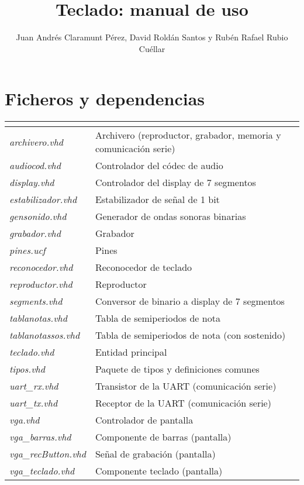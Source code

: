 \documentclass{article}
\title{Teclado: manual de uso}
\author{Juan Andrés Claramunt Pérez, David Roldán Santos y Rubén Rafael Rubio Cuéllar}
\begin{document}
\maketitle

\section{Ficheros y dependencias}

\let\sep\hline


\begin{tabu}{| >{\itshape}X[2, l] | X[7, l] |}
	 \\ \sep
	archivero.vhd & Archivero (reproductor, grabador, memoria y comunicación serie) \\ \sep
	audiocod.vhd & Controlador del códec de audio \\ \sep
	display.vhd & Controlador del display de 7 segmentos \\ \sep
	estabilizador.vhd & Estabilizador de señal de 1 bit \\ \sep
	gensonido.vhd & Generador de ondas sonoras binarias \\ \sep
	grabador.vhd & Grabador \\ \sep
	pines.ucf & Pines \\ \sep
	reconocedor.vhd & Reconocedor de teclado \\ \sep
	reproductor.vhd & Reproductor \\ \sep
	segments.vhd & Conversor de binario a display de 7 segmentos \\ \sep
	tablanotas.vhd & Tabla de semiperiodos de nota \\ \sep
	tablanotassos.vhd & Tabla de semiperiodos de nota (con sostenido) \\ \sep
	teclado.vhd & Entidad principal \\ \sep
	tipos.vhd & Paquete de tipos y definiciones comunes \\ \sep
	uart\_rx.vhd & Transistor de la UART (comunicación serie) \\ \sep
	uart\_tx.vhd & Receptor de la UART (comunicación serie) \\ \sep
	vga.vhd & Controlador de pantalla \\ \sep
	vga\_barras.vhd & Componente de barras (pantalla) \\ \sep
	vga\_recButton.vhd & Señal de grabación (pantalla) \\ \sep
	vga\_teclado.vhd & Componente teclado (pantalla) \\ \sep


\end{tabu}
\end{document}
